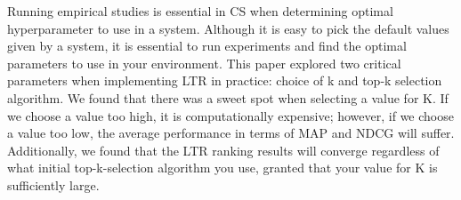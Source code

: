 \documentclass[letterpaper,12pt]{article}
\begin{document}
Running empirical studies is essential in CS when determining optimal hyperparameter to use in a system.
Although it is easy to pick the default values given by a system, it is essential to run experiments and find the optimal parameters to use in your environment.
This paper explored two critical parameters when implementing LTR in practice: choice of k and top-k selection algorithm.
We found that there was a sweet spot when selecting a value for K.
If we choose a value too high, it is computationally expensive; however, if we choose a value too low, the average performance in terms of MAP and NDCG will suffer.
Additionally, we found that the LTR ranking results will converge regardless of what initial top-k-selection algorithm you use, granted that your value for K is sufficiently large.



\end{document}
